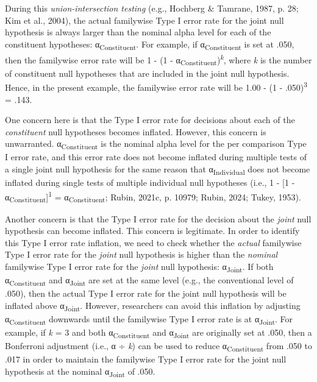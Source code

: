 \documentclass[authordate, empirical]{jote-new-article}
\begin{document}
	During this \emph{union-intersection testing} (e.g., Hochberg \& Tamrane, 1987, p. 28; Kim et al., 2004), the actual familywise Type I error rate for the joint null hypothesis is always larger than the nominal alpha level for each of the constituent hypotheses: α\textsubscript{Constituent}. For example, if α\textsubscript{Constituent} is set at .050, then the familywise error rate will be 1 - (1 - α\textsubscript{Constituent})\textsuperscript{\emph{k}}, where \emph{k} is the number of constituent null hypotheses that are included in the joint null hypothesis. Hence, in the present example, the familywise error rate will be 1.00 - (1 - .050)\textsuperscript{3} = .143.



	One concern here is that the Type I error rate for decisions about each of the \emph{constituent} null hypotheses becomes inflated. However, this concern is unwarranted. α\textsubscript{Constituent }is the nominal alpha level for the per comparison Type I error rate, and this error rate does not become inflated during multiple tests of a single joint null hypothesis for the same reason that α\textsubscript{Individual} does not become inflated during single tests of multiple individual null hypotheses (i.e., 1 - [1 - α\textsubscript{Constituent}]\textsuperscript{1} = α\textsubscript{Constituent}; Rubin, 2021c, p. 10979; Rubin, 2024; Tukey, 1953).



	Another concern is that the Type I error rate for the decision about the \emph{joint} null hypothesis can become inflated. This concern is legitimate. In order to identify this Type I error rate inflation, we need to check whether the \emph{actual} familywise Type I error rate for the \emph{joint} null hypothesis is higher than the \emph{nominal} familywise Type I error rate for the \emph{joint} null hypothesis: α\textsubscript{Joint}. If both α\textsubscript{Constituent} and α\textsubscript{Joint} are set at the same level (e.g., the conventional level of .050), then the actual Type I error rate for the joint null hypothesis will be inflated above α\textsubscript{Joint}. However, researchers can avoid this inflation by adjusting α\textsubscript{Constituent} downwards until the familywise Type I error rate is at α\textsubscript{Joint}. For example, if \emph{k} = 3 and both α\textsubscript{Constituent} and α\textsubscript{Joint} are originally set at .050, then a Bonferroni adjustment (i.e., α ÷ \emph{k}) can be used to reduce α\textsubscript{Constituent} from .050 to .017 in order to maintain the familywise Type I error rate for the joint null hypothesis at the nominal α\textsubscript{Joint} of .050.
\end{document}
